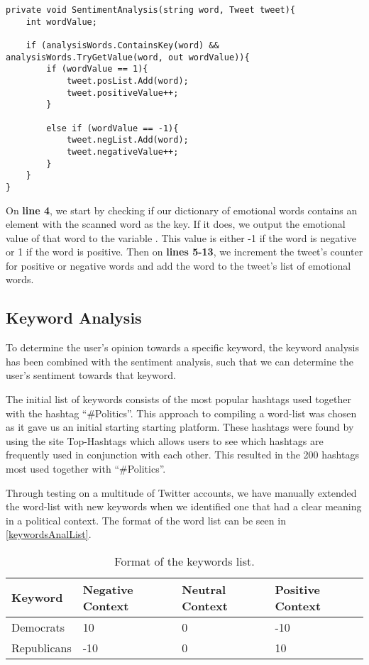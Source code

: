 \begin{minipage}[H]{\linewidth}
\begin{lstlisting}[caption = Determining the sentiment of a tweet. , label =
sentiAnalCode] 
private void SentimentAnalysis(string word, Tweet tweet){
	int wordValue;

    if (analysisWords.ContainsKey(word) && analysisWords.TryGetValue(word, out wordValue)){
    	if (wordValue == 1){
        	tweet.posList.Add(word);
            tweet.positiveValue++;
        }

        else if (wordValue == -1){
        	tweet.negList.Add(word);
            tweet.negativeValue++;
        }
    }
}
\end{lstlisting}
\end{minipage}

On \textbf{line 4}, we start by checking if our dictionary of emotional words
contains an element with the scanned word as the key. If it does, we output the
emotional value of that word to the variable . This value is
either -1 if the word is negative or 1 if the word is positive. Then on
\textbf{lines 5-13}, we increment the tweet's counter for positive or
negative words and add the word to the tweet's list of emotional words.

\subsection{Keyword Analysis}
To determine the user's opinion towards a specific keyword, the keyword
analysis has been combined with the sentiment analysis, such that we can
determine the user's sentiment towards that keyword.

The initial list of keywords consists of the most popular hashtags used together
with the hashtag ``\#Politics''. This approach to compiling a word-list was
chosen as it gave us an initial starting starting platform. These hashtags were
found by using the site Top-Hashtags \citep{topHashtags} which allows users to see which
hashtags are frequently used in conjunction with each other. This resulted in
the 200 hashtags most used together with ``\#Politics''.\nl

Through testing on a multitude of Twitter accounts, we have manually
extended the word-list with new keywords when we identified one that had a clear meaning in a
political context. The format of the word list can be seen in
\autoref{keywordsAnalList}.\\

\begin{table}[H]
\begin{tabular}{|l|l|l|l|}\hline
\textbf{Keyword} & \textbf{Negative Context} & \textbf{Neutral Context} & \textbf{Positive Context} \\\hline
Democrats & 10 & 0 & -10 \\\hline
Republicans & -10 & 0 & 10 \\\hline
\end{tabular}
\caption{Format of the keywords list.}
\label{keywordsAnalList}
\end{table} 

